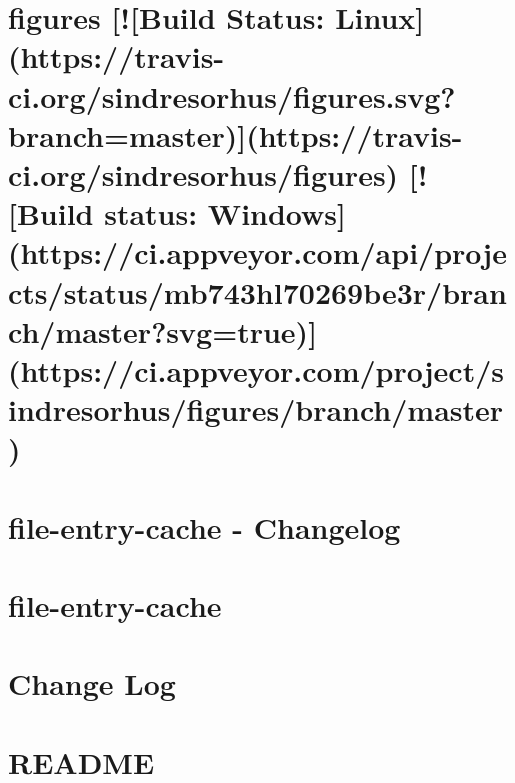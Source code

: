 \documentclass[twoside]{book}
\newcommand{\+}{\discretionary{\mbox{\scriptsize$\hookleftarrow$}}{}{}}
\begin{document}
\chapter{figures \mbox{[}!\mbox{[}Build Status\+: Linux\mbox{]}(https\+://travis-\/ci.org/sindresorhus/figures.svg?branch=master)\mbox{]}(https\+://travis-\/ci.org/sindresorhus/figures) \mbox{[}!\mbox{[}Build status\+: Windows\mbox{]}(https\+://ci.appveyor.\+com/api/projects/status/mb743hl70269be3r/branch/master?svg=true)\mbox{]}(https\+://ci.appveyor.\+com/project/sindresorhus/figures/branch/master)}
\label{md__c_1_workspace_demo_src_main_script_node_modules_figures_readme}

\chapter{file-\/entry-\/cache -\/ Changelog}
\label{md__c_1_workspace_demo_src_main_script_node_modules_file-entry-cache_changelog}

\chapter{file-\/entry-\/cache}
\label{md__c_1_workspace_demo_src_main_script_node_modules_file-entry-cache__r_e_a_d_m_e}

\chapter{Change Log}
\label{md__c_1_workspace_demo_src_main_script_node_modules_file-loader__c_h_a_n_g_e_l_o_g}

\chapter{R\+E\+A\+D\+ME}
\label{md__c_1_workspace_demo_src_main_script_node_modules_file-loader__r_e_a_d_m_e}

\end{document}

